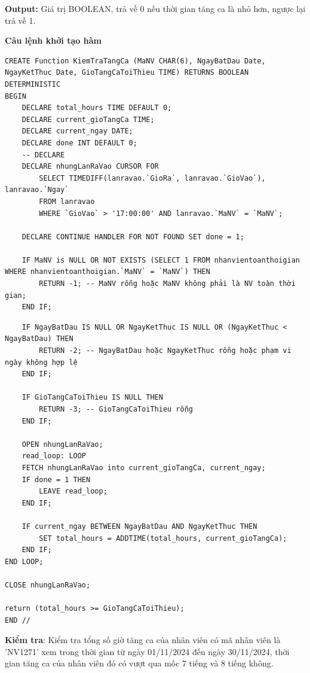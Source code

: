 \textbf{Output:} Giá trị BOOLEAN, trả về 0 nếu thời gian tăng ca là nhỏ hơn, ngược lại trả về 1.

\textbf{Câu lệnh khởi tạo hàm}
\begin{verbatim}
CREATE Function KiemTraTangCa (MaNV CHAR(6), NgayBatDau Date, NgayKetThuc Date, GioTangCaToiThieu TIME) RETURNS BOOLEAN DETERMINISTIC
BEGIN 
    DECLARE total_hours TIME DEFAULT 0;
    DECLARE current_gioTangCa TIME;
    DECLARE current_ngay DATE;
    DECLARE done INT DEFAULT 0;
    -- DECLARE 
    DECLARE nhungLanRaVao CURSOR FOR 
        SELECT TIMEDIFF(lanravao.`GioRa`, lanravao.`GioVao`), lanravao.`Ngay`
        FROM lanravao 
        WHERE `GioVao` > '17:00:00' AND lanravao.`MaNV` = `MaNV`;

    DECLARE CONTINUE HANDLER FOR NOT FOUND SET done = 1;
    
    IF MaNV is NULL OR NOT EXISTS (SELECT 1 FROM nhanvientoanthoigian WHERE nhanvientoanthoigian.`MaNV` = `MaNV`) THEN 
        RETURN -1; -- MaNV rỗng hoặc MaNV không phải là NV toàn thời gian;
    END IF; 

\end{verbatim}
\begin{verbatim}
    IF NgayBatDau IS NULL OR NgayKetThuc IS NULL OR (NgayKetThuc < NgayBatDau) THEN 
        RETURN -2; -- NgayBatDau hoặc NgayKetThuc rỗng hoặc phạm vi ngày không hợp lệ
    END IF;

    IF GioTangCaToiThieu IS NULL THEN
        RETURN -3; -- GioTangCaToiThieu rỗng
    END IF;

    OPEN nhungLanRaVao;
    read_loop: LOOP
    FETCH nhungLanRaVao into current_gioTangCa, current_ngay;
    IF done = 1 THEN
        LEAVE read_loop;
    END IF;

    IF current_ngay BETWEEN NgayBatDau AND NgayKetThuc THEN
        SET total_hours = ADDTIME(total_hours, current_gioTangCa);
    END IF;
END LOOP;

CLOSE nhungLanRaVao;

return (total_hours >= GioTangCaToiThieu);
END //
\end{verbatim}
\newpage
\textbf{Kiểm tra}: Kiểm tra tổng số giờ tăng ca của nhân viên có mã nhân viên là 'NV1271' xem trong thời gian từ ngày 01/11/2024 đến ngày 30/11/2024, thời gian tăng ca của nhân viên đó có vượt qua mốc 7 tiếng và 8 tiếng không.

